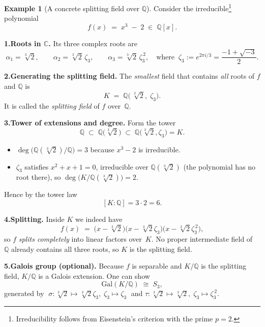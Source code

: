 \documentclass[12pt]{article}
\theoremstyle{definition} %
\newtheorem{example}{Example}
\theoremstyle{plain} %
\begin{document}
    \begin{example}[A concrete splitting field over $\mathbb{Q}$]
      Consider the irreducible\footnote{%
      Irreducibility follows from Eisenstein’s criterion with the prime
      $p=2$.} polynomial
      \[
            f(x)\;=\;x^{3}\;-\;2\;\in\;\mathbb{Q}[x].
      \]
      
      \medskip
      \textbf{1.\;Roots in $\mathbb{C}$.}\;
      Its three complex roots are
      \[
            \alpha_{1}= \sqrt[3]{2},\qquad
            \alpha_{2}= \sqrt[3]{2}\,\zeta_{3},\qquad
            \alpha_{3}= \sqrt[3]{2}\,\zeta_{3}^{\,2},
            \quad\text{where}\;\;
            \zeta_{3}:=e^{2\pi i/3}=\frac{-1+\sqrt{-3}}{2}.
      \]
      
      \medskip
      \textbf{2.\;Generating the splitting field.}\;
      The \emph{smallest} field that contains \emph{all}
      roots of $f$ and $\mathbb{Q}$ is
      \[
            K\;=\;\mathbb{Q}\bigl(\,\sqrt[3]{2},\;\zeta_{3}\bigr).
      \]
      It is called the \emph{splitting field} of $f$ over~$\mathbb{Q}$.
      
      \medskip
      \textbf{3.\;Tower of extensions and degree.}\;
      Form the tower
      \[
            \mathbb{Q} \;\subset\; \mathbb{Q}\bigl(\sqrt[3]{2}\bigr) 
              \;\subset\; \mathbb{Q}\bigl(\sqrt[3]{2},\zeta_{3}\bigr)=K.
      \]
      \begin{itemize}
        \item $\deg\bigl(\mathbb{Q}(\sqrt[3]{2})/\mathbb{Q}\bigr)=3$
              because $x^{3}-2$ is irreducible.
        \item $\zeta_{3}$ satisfies $x^{2}+x+1=0$, irreducible over
              $\mathbb{Q}(\sqrt[3]{2})$ (the polynomial has no root there),  
              so $\deg\bigl(K/\mathbb{Q}(\sqrt[3]{2})\bigr)=2$.
      \end{itemize}
      Hence by the tower law
      \[
            [K:\mathbb{Q}]=3\cdot 2=6.
      \]
      
      \medskip
      \textbf{4.\;Splitting.}\;
      Inside $K$ we indeed have
      \[
            f(x)\;=\;
            \bigl(x-\sqrt[3]{2}\bigr)
            \bigl(x-\sqrt[3]{2}\zeta_{3}\bigr)
            \bigl(x-\sqrt[3]{2}\zeta_{3}^{\,2}\bigr),
      \]
      so $f$ \emph{splits completely} into linear factors over~$K$.
      No proper intermediate field of~$\mathbb{{Q}}$ already contains
      all three roots, so $K$ is the splitting field.
      
      \medskip
      \textbf{5.\;Galois group (optional).}\;
      Because $f$ is separable and $K/\mathbb{{Q}}$ is the splitting field,
      $K/\mathbb{{Q}}$ is a Galois extension.
      One can show
      \[
            \mathrm{Gal}(K/\mathbb{{Q}})\;\cong\;S_{3},
      \]
      generated by 
      $\;\sigma:\sqrt[3]{2}\!\mapsto\!\sqrt[3]{2}\zeta_{3},\;
        \zeta_{3}\!\mapsto\!\zeta_{3}\;$
      and
      $\tau:\sqrt[3]{2}\!\mapsto\!\sqrt[3]{2},\;
        \zeta_{3}\!\mapsto\!\zeta_{3}^{\,2}$.
      

\end{example}
\end{document}
